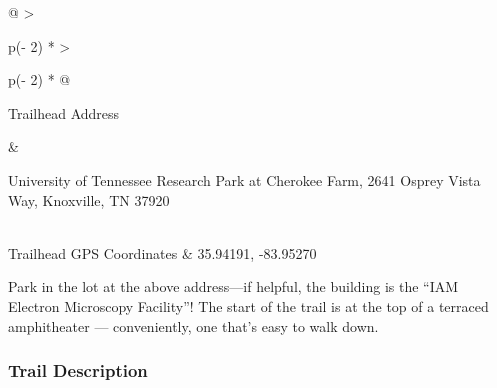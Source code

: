 \documentclass[
  letterpaper,
  DIV=11,
  numbers=noendperiod]{scrartcl}
\begin{document}
\begin{longtable}[]{@{}
  >{\raggedright\arraybackslash}p{(\columnwidth - 2\tabcolsep) * }
  >{\raggedright\arraybackslash}p{(\columnwidth - 2\tabcolsep) * }@{}}
\toprule\noalign{}
\begin{minipage}[b]{\linewidth}\raggedright
Trailhead Address
\end{minipage} & \begin{minipage}[b]{\linewidth}\raggedright
University of Tennessee Research Park at Cherokee Farm, 2641 Osprey
Vista Way, Knoxville, TN 37920
\end{minipage} \\
\midrule\noalign{}
\endhead
\bottomrule\noalign{}
\endlastfoot
Trailhead GPS Coordinates & 35.94191, -83.95270 \\
\end{longtable}

Park in the lot at the above address---if helpful, the building is the
``IAM Electron Microscopy Facility''! The start of the trail is at the
top of a terraced amphitheater --- conveniently, one that's easy to walk
down.

\hypertarget{trail-description-5}{%
\subsubsection{Trail Description}\label{trail-description-5}}
\end{document}

